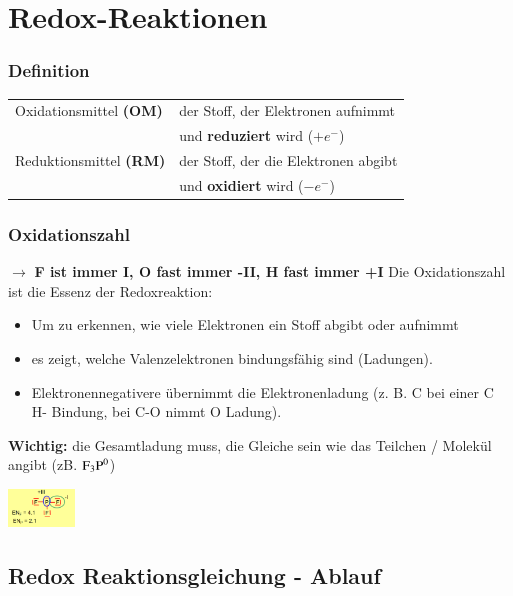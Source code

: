 \section{Redox-Reaktionen}

\subsubsection{Definition}
\begin{tabular}{l l}
	Oxidationsmittel \textbf{(OM)} & der Stoff, der Elektronen aufnimmt                  \\
	                               & und \textbf{reduziert} wird ($+e^-$)                       \\
	Reduktionsmittel \textbf{(RM)} & der Stoff, der die Elektronen abgibt                \\
	                               & und \textbf{oxidiert} wird ($-e^-$)                        \\
\end{tabular}

\subsubsection{Oxidationszahl}
$\rightarrow$ \textbf{F ist immer I, O fast immer -II, H fast immer +I} \newline
Die Oxidationszahl ist die Essenz der Redoxreaktion:
\begin{itemize}
	\item Um zu erkennen, wie viele Elektronen ein Stoff abgibt oder aufnimmt 
	\item es zeigt, welche Valenzelektronen bindungsfähig sind (Ladungen). 
	\item Elektronennegativere übernimmt die Elektronenladung \newline (z. B. C bei einer C H- Bindung, bei C-O nimmt O Ladung). 
\end{itemize}
\textbf{Wichtig:} die Gesamtladung muss, die Gleiche sein wie das Teilchen / Molekül angibt (zB. $\ce{F3P^0}$)\newline 
\begin{center}
	\includegraphics[height=1cm]{images/OZ.png}
\end{center}

\subsection{Redox Reaktionsgleichung - Ablauf}

